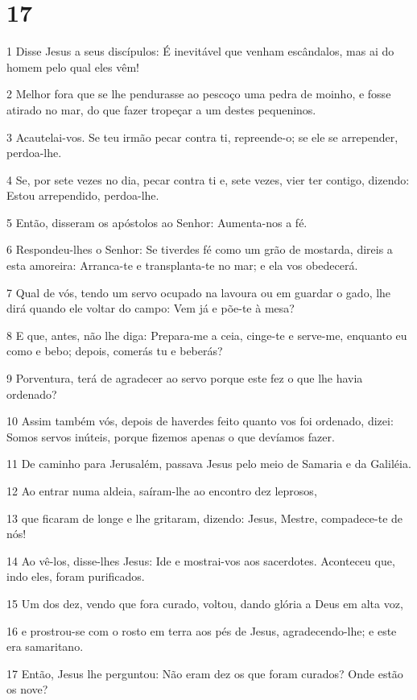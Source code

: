 \chapter{17}

\par 1 Disse Jesus a seus discípulos: É inevitável que venham escândalos, mas ai do homem pelo qual eles vêm!
\par 2 Melhor fora que se lhe pendurasse ao pescoço uma pedra de moinho, e fosse atirado no mar, do que fazer tropeçar a um destes pequeninos.
\par 3 Acautelai-vos. Se teu irmão pecar contra ti, repreende-o; se ele se arrepender, perdoa-lhe.
\par 4 Se, por sete vezes no dia, pecar contra ti e, sete vezes, vier ter contigo, dizendo: Estou arrependido, perdoa-lhe.
\par 5 Então, disseram os apóstolos ao Senhor: Aumenta-nos a fé.
\par 6 Respondeu-lhes o Senhor: Se tiverdes fé como um grão de mostarda, direis a esta amoreira: Arranca-te e transplanta-te no mar; e ela vos obedecerá.
\par 7 Qual de vós, tendo um servo ocupado na lavoura ou em guardar o gado, lhe dirá quando ele voltar do campo: Vem já e põe-te à mesa?
\par 8 E que, antes, não lhe diga: Prepara-me a ceia, cinge-te e serve-me, enquanto eu como e bebo; depois, comerás tu e beberás?
\par 9 Porventura, terá de agradecer ao servo porque este fez o que lhe havia ordenado?
\par 10 Assim também vós, depois de haverdes feito quanto vos foi ordenado, dizei: Somos servos inúteis, porque fizemos apenas o que devíamos fazer.
\par 11 De caminho para Jerusalém, passava Jesus pelo meio de Samaria e da Galiléia.
\par 12 Ao entrar numa aldeia, saíram-lhe ao encontro dez leprosos,
\par 13 que ficaram de longe e lhe gritaram, dizendo: Jesus, Mestre, compadece-te de nós!
\par 14 Ao vê-los, disse-lhes Jesus: Ide e mostrai-vos aos sacerdotes. Aconteceu que, indo eles, foram purificados.
\par 15 Um dos dez, vendo que fora curado, voltou, dando glória a Deus em alta voz,
\par 16 e prostrou-se com o rosto em terra aos pés de Jesus, agradecendo-lhe; e este era samaritano.
\par 17 Então, Jesus lhe perguntou: Não eram dez os que foram curados? Onde estão os nove?
